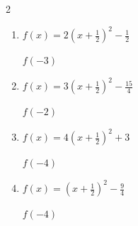 \begin{multicols}{2}
\begin{enumerate}
$f(-4)$
        \phantom{$=-73$}

  \item $\displaystyle f(x)=2\left( x+\frac{1}{2}\right)^{2}-\frac{1}{2}$

$f(-3)$
        \phantom{$=12$}

  \item $\displaystyle f(x)=3\left( x+\frac{1}{2}\right)^{2}-\frac{15}{4}$

$f(-2)$
        \phantom{$=3$}

  \item $\displaystyle f(x)=4\left( x+\frac{1}{2}\right)^{2}+3$

$f(-4)$
        \phantom{$=52$}

  \item $\displaystyle f(x)=\left( x+\frac{1}{2}\right)^{2}-\frac{9}{4}$

$f(-4)$
        \phantom{$=10$}

\end{enumerate}
\end{multicols}

\newpage
\resetdrill

